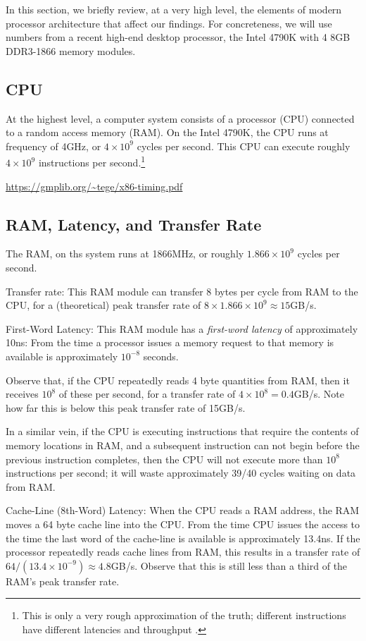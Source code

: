 \documentclass{patmorin}
\begin{document}
In this section, we briefly review, at a very high level, the elements of
modern processor architecture that affect our findings.  For concreteness,
we will use numbers from a recent high-end desktop processor, the Intel
4790K \cite{S} with 4 8GB DDR3-1866 memory modules.

\subsection{CPU}

At the highest level, a computer system consists of a processor (CPU)
connected to a random access memory (RAM). On the Intel 4790K, the CPU
runs at frequency of 4GHz, or $4\times10^9$ cycles per second.  This CPU
can execute roughly $4\times 10^{9}$ instructions per second.\footnote{This is only a very rough approximation of the truth; different instructions have different latencies and throughput \cite{granlund.instruction}.}

\url{https://gmplib.org/~tege/x86-timing.pdf}


\subsection{RAM, Latency, and Transfer Rate}

The RAM, on ths system runs at 1866MHz, or roughly $1.866\times10^9$
cycles per second.

Transfer rate: This RAM module can transfer 8 bytes per cycle from RAM
to the CPU, for a (theoretical) peak transfer rate of 
$8\times 1.866\times10^9\approx 15$GB/s.

First-Word Latency: This RAM module has a \emph{first-word latency} of
approximately 10ns: From the time a processor issues a memory request
to that memory is available is approximately $10^{-8}$ seconds.

Observe that, if the CPU repeatedly reads 4 byte quantities from RAM,
then it receives $10^8$ of these per second, for a transfer rate of
$4\times 10^8=0.4$GB/s.  Note how far this is below this peak transfer
rate of 15GB/s.

In a similar vein, if the CPU is executing instructions that require
the contents of memory locations in RAM, and a subsequent instruction
can not begin before the previous instruction completes, then the CPU
will not execute more than $10^8$ instructions per second; it will waste
approximately 39/40 cycles waiting on data from RAM.

Cache-Line (8th-Word) Latency:  When the CPU reads a RAM address, the
RAM moves a 64 byte cache line into the CPU. From the time CPU issues
the access to the time the last word of the cache-line is available is
approximately 13.4ns.  If the processor repeatedly reads cache lines
from RAM, this results in a transfer rate of $64 / (13.4\times10^{-9})
\approx 4.8$GB/s.  Observe that this is still less than a third of the
RAM's peak transfer rate.
\end{document}
